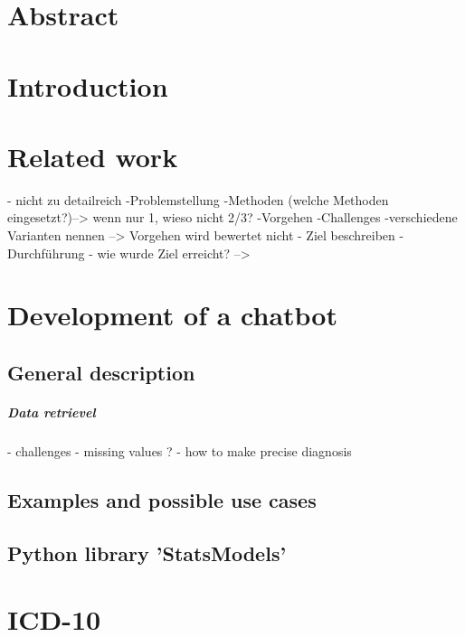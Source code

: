 




\chapter{Abstract}\label{abstract}


\chapter{Introduction}\label{introduction}

\chapter{Related work}\label{related}
- nicht zu detailreich
-Problemstellung
-Methoden (welche Methoden eingesetzt?)--> wenn nur 1, wieso nicht 2/3?
-Vorgehen
-Challenges
-verschiedene Varianten nennen
--> Vorgehen wird bewertet nicht 
- Ziel beschreiben
- Durchführung
- wie wurde Ziel erreicht? --> 

\chapter{Development of a chatbot}\label{chatbot}

\section{General description}\label{general_description}

\paragraph{Data retrievel}

- challenges 
- missing values ? 
- how to make precise diagnosis

\section{Examples and possible use cases}\label{examples}
  
\section{Python library 'StatsModels'}\label{statsmodels}          
              
\chapter{ICD-10 }\label{african_eco_hist}

